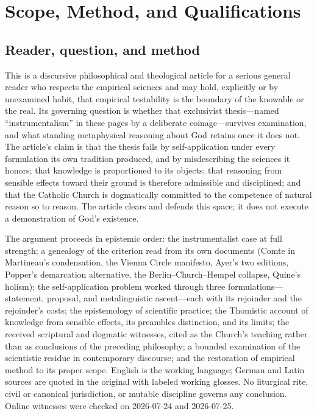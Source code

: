 \section{Scope, Method, and Qualifications}

\subsection{Reader, question, and method}

This is a discursive philosophical and theological article for a serious general reader who respects the empirical sciences and may hold, explicitly or by unexamined habit, that empirical testability is the boundary of the knowable or the real. Its governing question is whether that exclusivist thesis---named ``instrumentalism'' in these pages by a deliberate coinage---survives examination, and what standing metaphysical reasoning about God retains once it does not. The article's claim is that the thesis fails by self-application under every formulation its own tradition produced, and by misdescribing the sciences it honors; that knowledge is proportioned to its objects; that reasoning from sensible effects toward their ground is therefore admissible and disciplined; and that the Catholic Church is dogmatically committed to the competence of natural reason so to reason. The article clears and defends this space; it does not execute a demonstration of God's existence.

The argument proceeds in epistemic order: the instrumentalist case at full strength; a genealogy of the criterion read from its own documents (Comte in Martineau's condensation, the Vienna Circle manifesto, Ayer's two editions, Popper's demarcation alternative, the Berlin--Church--Hempel collapse, Quine's holism); the self-application problem worked through three formulations---statement, proposal, and metalinguistic ascent---each with its rejoinder and the rejoinder's costs; the epistemology of scientific practice; the Thomistic account of knowledge from sensible effects, its preambles distinction, and its limits; the received scriptural and dogmatic witnesses, cited as the Church's teaching rather than as conclusions of the preceding philosophy; a bounded examination of the scientistic residue in contemporary discourse; and the restoration of empirical method to its proper scope. English is the working language; German and Latin sources are quoted in the original with labeled working glosses. No liturgical rite, civil or canonical jurisdiction, or mutable discipline governs any conclusion. Online witnesses were checked on 2026-07-24 and 2026-07-25.

